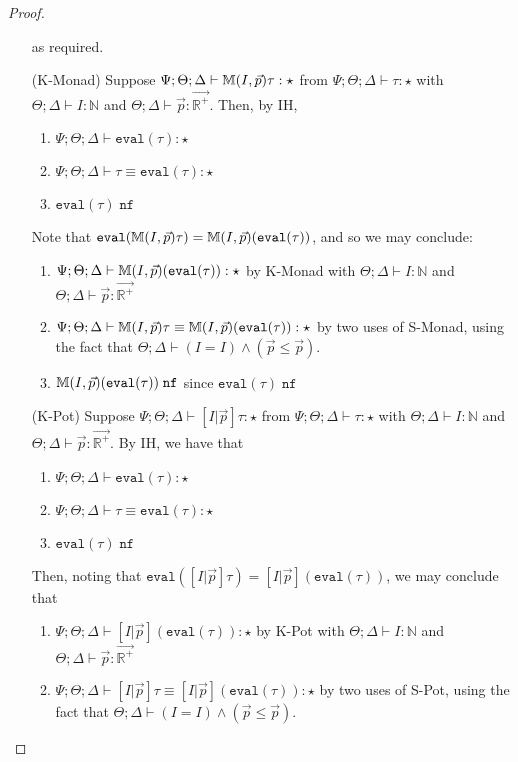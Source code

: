 \begin{proof}
\begin{enumerate}
\begin{enumerate}[1.]
  \end{enumerate}
  as required.
  \item[(K-Monad)] Suppose ${\Psi ; \Theta ; \Delta \vdash \mathbb{M}(I,\vec{p}) \tau : \star}$ from $\Psi ; \Theta ; \Delta \vdash \tau : \star$ with $ \Theta ; \Delta \vdash I : \mathbb{N}$ and $\Theta ; \Delta \vdash \vec{p} : \vec{\mathbb{R}^+}$. Then, by IH,
  \begin{enumerate}[1.]
    \item $\Psi ; \Theta ; \Delta \vdash \texttt{eval}(\tau) : \star$
    \item $\Psi ; \Theta ; \Delta \vdash \tau \equiv \texttt{eval}(\tau) : \star$
    \item $\texttt{eval}(\tau) \; \texttt{nf}$
  \end{enumerate}
  Note that $\texttt{eval}(\mathbb{M}(I,\vec{p}) \tau) = \mathbb{M}(I,\vec{p})(\texttt{eval}(\tau))$, and so we may conclude:
  \begin{enumerate}
    \item $\Psi ; \Theta ; \Delta \vdash \mathbb{M}(I,\vec{p})(\texttt{eval}(\tau)) : \star$ by K-Monad with $ \Theta ; \Delta \vdash I : \mathbb{N}$ and $\Theta ; \Delta \vdash \vec{p} : \vec{\mathbb{R}^+}$
    \item $\Psi ; \Theta ; \Delta \vdash \mathbb{M}(I,\vec{p}) \tau \equiv \mathbb{M}(I,\vec{p})(\texttt{eval}(\tau)) : \star$ by two uses of S-Monad, using the fact that $\Theta ; \Delta \vdash (I = I) \wedge (\vec{p} \leq \vec{p})$.
    \item $\mathbb{M}(I,\vec{p})(\texttt{eval}(\tau)) \; \texttt{nf}$ since $\texttt{eval}(\tau) \; \texttt{nf}$
  \end{enumerate}
  \item[(K-Pot)] Suppose ${\Psi ; \Theta ; \Delta \vdash [I|\vec{p}] \tau : \star}$ from $\Psi ; \Theta ; \Delta \vdash \tau : \star$ with $\Theta ; \Delta \vdash I : \mathbb{N}$ and $\Theta ; \Delta \vdash \vec{p} : \vec{\mathbb{R}^+}$. By IH, we have that
    \begin{enumerate}[1.]
    \item $\Psi ; \Theta ; \Delta \vdash \texttt{eval}(\tau) : \star$
    \item $\Psi ; \Theta ; \Delta \vdash \tau \equiv \texttt{eval}(\tau) : \star$
    \item $\texttt{eval}(\tau) \; \texttt{nf}$
  \end{enumerate}
  Then, noting that $\texttt{eval}([I|\vec{p}] \tau) = [I|\vec{p}] (\texttt{eval}(\tau))$, we may conclude that
  \begin{enumerate}[1.]
    \item $\Psi ; \Theta ; \Delta \vdash [I|\vec{p}] (\texttt{eval}(\tau)) : \star$ by K-Pot with $\Theta ; \Delta \vdash I : \mathbb{N}$ and $\Theta ; \Delta \vdash \vec{p} : \vec{\mathbb{R}^+}$
    \item  $\Psi ; \Theta ; \Delta \vdash [I|\vec{p}] \tau \equiv [I|\vec{p}] (\texttt{eval}(\tau)) : \star$ by two uses of S-Pot, using the fact that $\Theta ; \Delta \vdash (I = I) \wedge (\vec{p} \leq \vec{p})$.
  \end{enumerate}
  

\end{enumerate}
\end{proof}
